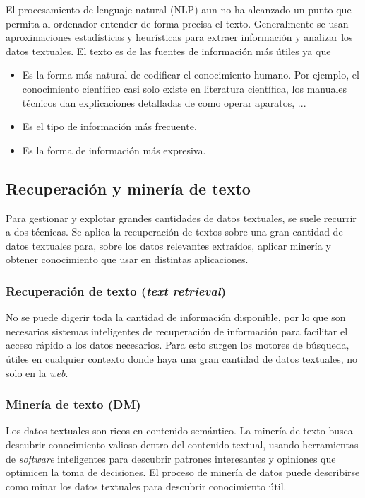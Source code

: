 El procesamiento de lenguaje natural (NLP) aun no ha alcanzado un punto que permita al ordenador entender de forma precisa el texto. Generalmente se usan aproximaciones estadísticas y heurísticas para extraer información y analizar los datos textuales. El texto es de las fuentes de información más útiles ya que 
\begin{itemize}
\item Es la forma más natural de codificar el conocimiento humano. Por ejemplo, el conocimiento científico casi solo existe en literatura científica, los manuales técnicos dan explicaciones detalladas de como operar aparatos, ...
\item Es el tipo de información más frecuente.
\item Es la forma de información más expresiva.
\end{itemize}

\subsection{Recuperación y minería de texto}

\noindent Para gestionar y explotar grandes cantidades de datos textuales, se suele recurrir a dos técnicas. Se aplica la recuperación de textos sobre una gran cantidad de datos textuales para, sobre los datos relevantes extraídos, aplicar minería y obtener conocimiento que usar en distintas aplicaciones.

\subsubsection{Recuperación de texto (\textit{text retrieval})}

No se puede digerir toda la cantidad de información disponible, por lo que son necesarios sistemas inteligentes de recuperación de información para facilitar el acceso rápido a los datos necesarios. Para esto surgen los motores de búsqueda, útiles en cualquier contexto donde haya una gran cantidad de datos textuales, no solo en la \textit{web}. 

\subsubsection{Minería de texto (DM)}

Los datos textuales son ricos en contenido semántico. La minería de texto busca descubrir conocimiento valioso dentro del contenido textual, usando herramientas de \textit{software} inteligentes para descubrir patrones interesantes y opiniones que optimicen la toma de decisiones. El proceso de minería de datos puede describirse como minar los datos textuales para descubrir conocimiento útil. \\

